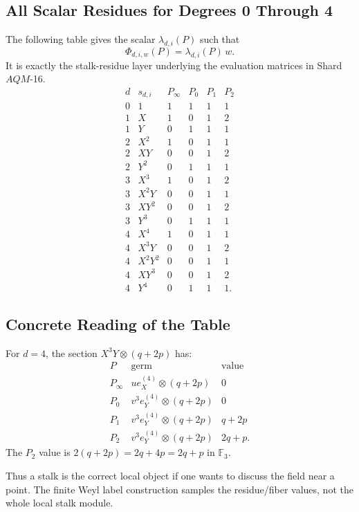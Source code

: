 \subsection{All Scalar Residues for Degrees 0 Through 4}

The following table gives the scalar \(\lambda_{d,i}(P)\) such that
\[
  \Phi_{d,i,w}(P)=\lambda_{d,i}(P)\,w.
\]
It is exactly the stalk-residue layer underlying the evaluation matrices in
Shard \(AQM\)-16.
\[
\begin{array}{c|c|c|c|c|c}
d & s_{d,i} & P_\infty & P_0 & P_1 & P_2\\
\hline
0 & 1       & 1 & 1 & 1 & 1\\
\hline
1 & X       & 1 & 0 & 1 & 2\\
1 & Y       & 0 & 1 & 1 & 1\\
\hline
2 & X^2     & 1 & 0 & 1 & 1\\
2 & XY      & 0 & 0 & 1 & 2\\
2 & Y^2     & 0 & 1 & 1 & 1\\
\hline
3 & X^3     & 1 & 0 & 1 & 2\\
3 & X^2Y    & 0 & 0 & 1 & 1\\
3 & XY^2    & 0 & 0 & 1 & 2\\
3 & Y^3     & 0 & 1 & 1 & 1\\
\hline
4 & X^4     & 1 & 0 & 1 & 1\\
4 & X^3Y    & 0 & 0 & 1 & 2\\
4 & X^2Y^2  & 0 & 0 & 1 & 1\\
4 & XY^3    & 0 & 0 & 1 & 2\\
4 & Y^4     & 0 & 1 & 1 & 1.
\end{array}
\]

\subsection{Concrete Reading of the Table}

For \(d=4\), the section \(X^3Y\otimes(q+2p)\) has:
\[
\begin{array}{c|c|c}
P & \text{germ} & \text{value}\\
\hline
P_\infty & u e_X^{(4)}\otimes(q+2p) & 0\\
P_0 & v^3 e_Y^{(4)}\otimes(q+2p) & 0\\
P_1 & v^3 e_Y^{(4)}\otimes(q+2p) & q+2p\\
P_2 & v^3 e_Y^{(4)}\otimes(q+2p) & 2q+p.
\end{array}
\]
The \(P_2\) value is \(2(q+2p)=2q+4p=2q+p\) in \(\mathbb F_3\).

Thus a stalk is the correct local object if one wants to discuss the field
near a point.  The finite Weyl label construction samples the residue/fiber
values, not the whole local stalk module.
